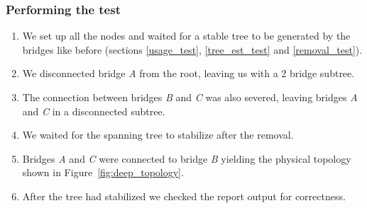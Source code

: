 \subsubsection*{Performing the test}
\begin{enumerate}
    \item We set up all the nodes and waited for a stable tree to be generated by the bridges like before (sections \ref{usage_test}, \ref{tree_est_test} and \ref{removal_test}).
    \item We disconnected bridge \textit{A} from the root, leaving us with a 2 bridge subtree.
    \item The connection between bridges \textit{B} and \textit{C} was also severed, leaving bridges \textit{A} and \textit{C} in a disconnected subtree.
    \item We waited for the spanning tree to stabilize after the removal.
    \item Bridges \textit{A} and \textit{C} were connected to bridge \textit{B} yielding the physical topology shown in Figure~\ref{fig:deep_topology}.
    \item After the tree had stabilized we checked the report output for correctness.
\end{enumerate}


